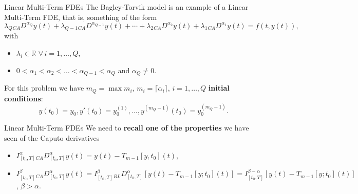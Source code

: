 \documentclass[aspectratio=169,xcolor=dvipsnames]{beamer}
\begin{document}
\begin{frame}{Linear Multi-Term FDEs}
The Bagley-Torvik model is an example of a \alert{Linear Multi-Term FDE}, that is, something of the form
\[
\lambda_Q {}_{CA}D^{\alpha_Q} y(t) + \lambda_{Q-1}{}_{CA}D^{\alpha_{Q-1}} y(t) + \cdots + \lambda_2 {}_{CA}D^{\alpha_2} y(t) + \lambda_1 {}_{CA}D^{\alpha_1}y(t) = f(t,y(t)),
\]
with 
\begin{itemize}
	\item $\lambda_i \in \mathbb{R}$ $\forall\,i=1,\ldots,Q$,
	\item $0 < \alpha_1 < \alpha_2 < \ldots < \alpha_{Q-1} < \alpha_Q$ and $\alpha_Q \neq 0$.
\end{itemize}
For this problem we have $m_Q = \max m_i$, $m_i = \lceil \alpha_i \rceil$, $i=1,\ldots,Q$ \textbf{initial conditions}:
\begin{equation*}
y(t_0) = y_0, y'(t_0) = y_0^{(1)}, \ldots, y^{(m_Q-1)}(t_0) = y_0^{(m_Q-1)}.
\end{equation*}


\end{frame}

\begin{frame}{Linear Multi-Term FDEs}
We need to \textbf{recall one of the properties} we have seen of the Caputo derivatives
\begin{itemize}
	\item[$(P_1)$] $I_{[t_0,T]}^\alpha {}_{CA}D_{[t_0,T]}^\alpha y(t) = y(t) - T_{m-1}[y,t_0](t)$,
	\item[$(P_2)$] $I_{[t_0,T]}^\beta {}_{CA}D_{[t_0,T]}^\alpha y(t) = I_{[t_0,T]}^\beta {}_{RL}D_{[t_0,T]}^\alpha \left[ y(t) - T_{m-1}[y;t_0](t) \right] =  I_{[t_0,T]}^{\beta-\alpha}\left[y(t) - T_{m-1}[y;t_0](t)\right]$, $\beta > \alpha$.
\end{itemize}

\end{frame}
\end{document}
